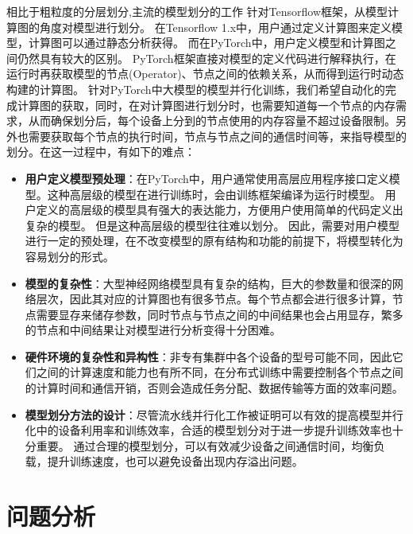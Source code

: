 相比于粗粒度的分层划分,主流的模型划分的工作 针对Tensorflow框架，从模型计算图的角度对模型进行划分。
在Tensorflow 1.x中，用户通过定义计算图来定义模型，计算图可以通过静态分析获得。
而在PyTorch中，用户定义模型和计算图之间仍然具有较大的区别。
PyTorch框架直接对模型的定义代码进行解释执行，在运行时再获取模型的节点(Operator)、节点之间的依赖关系，从而得到运行时动态构建的计算图。
针对PyTorch中大模型的模型并行化训练，我们希望自动化的完成计算图的获取，同时，在对计算图进行划分时，也需要知道每一个节点的内存需求，从而确保划分后，每个设备上分到的节点使用的内存容量不超过设备限制。另外也需要获取每个节点的执行时间，节点与节点之间的通信时间等，来指导模型的划分。在这一过程中，有如下的难点：
\begin{itemize}
	\item \textbf{用户定义模型预处理}：在PyTorch中，用户通常使用高层应用程序接口定义模型。这种高层级的模型在进行训练时，会由训练框架编译为运行时模型。
	用户定义的高层级的模型具有强大的表达能力，方便用户使用简单的代码定义出复杂的模型。
	但是这种高层级的模型往往难以划分。
	因此，需要对用户模型进行一定的预处理，在不改变模型的原有结构和功能的前提下，将模型转化为容易划分的形式。
	\item \textbf{模型的复杂性}：大型神经网络模型具有复杂的结构，巨大的参数量和很深的网络层次，因此其对应的计算图也有很多节点。每个节点都会进行很多计算，节点需要显存来储存参数，同时节点与节点之间的中间结果也会占用显存，繁多的节点和中间结果让对模型进行分析变得十分困难。
	\item \textbf{硬件环境的复杂性和异构性}：非专有集群中各个设备的型号可能不同，因此它们之间的计算速度和能力也有所不同，在分布式训练中需要控制各个节点之间的计算时间和通信开销，否则会造成任务分配、数据传输等方面的效率问题。
	\item \textbf{模型划分方法的设计}：尽管流水线并行化工作被证明可以有效的提高模型并行化中的设备利用率和训练效率，合适的模型划分对于进一步提升训练效率也十分重要。
	通过合理的模型划分，可以有效减少设备之间通信时间，均衡负载，提升训练速度，也可以避免设备出现内存溢出问题。
\end{itemize}


\section{问题分析}
\label{sec:analysis}
% 

